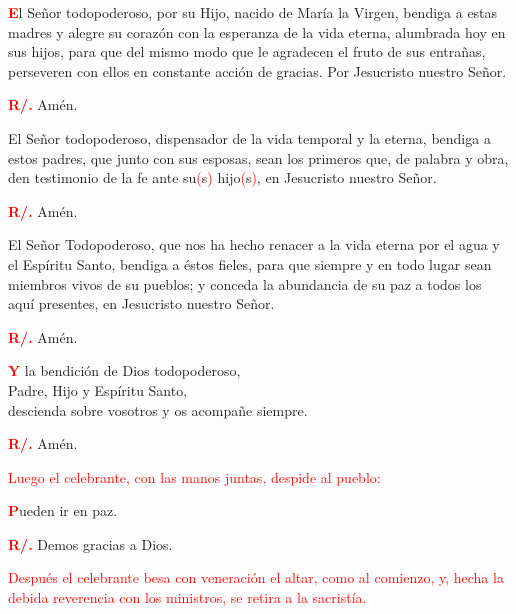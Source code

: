 \documentclass[12pt, letterpaper, spanish]{article}
\begin{document}
  \lettrine[lines=2]{\bfseries \textcolor{red}{E}}{}\Large l Se\~nor todopoderoso, por su Hijo, nacido de Mar\'ia la Virgen, bendiga a estas madres y alegre su coraz\'on con la esperanza de la vida eterna, alumbrada hoy en sus hijos, para que del mismo modo que le agradecen el fruto de sus entra\~nas, perseveren con ellos en constante acci\'on de gracias. Por Jesucristo nuestro Se\~nor.

  \noindent
  \Large {\bfseries \textcolor{red}{R/.}} \hspace{0.5cm} Am\'en.

  \noindent
  \Large El Se\~nor todopoderoso, dispensador de la vida temporal y la eterna, bendiga a estos padres, que junto con sus esposas, sean los primeros que, de palabra y obra, den testimonio de la fe ante su\textcolor{red}{(}s\textcolor{red}{)} hijo\textcolor{red}{(}s\textcolor{red}{)}, en Jesucristo nuestro Se\~nor.

  \noindent
  \Large {\bfseries \textcolor{red}{R/.}} \hspace{0.5cm} Am\'en.

  \noindent
  \Large El Se\~nor Todopoderoso, que nos ha hecho renacer a la vida eterna por el agua y el Esp\'iritu Santo, bendiga a \'estos fieles, para que siempre y en todo lugar sean miembros vivos de su pueblos; y conceda la abundancia de su paz a todos los aqu\'i presentes, en Jesucristo nuestro Se\~nor.

  \noindent
  \Large {\bfseries \textcolor{red}{R/.}} \hspace{0.5cm} Am\'en.

  \clearpage

  \lettrine[lines=2]{\bfseries \textcolor{red}{Y}}{} \Large la bendici\'on de Dios todopoderoso, \\
  Padre, Hijo \Huge{\textcolor{red}{}} \Large y Esp\'iritu Santo, \\
  descienda sobre vosotros y os acompa\~ne siempre.

  \noindent
  \Large {\bfseries \textcolor{red}{R/.}} \hspace{0.5cm} Am\'en.

  \large{\textcolor{red}{Luego el celebrante, con las manos juntas, despide al pueblo:}}
  
  \lettrine[lines=1]{\bfseries \textcolor{red}{P}}{}\Large ueden ir en paz.

  \noindent
  \Large {\bfseries \textcolor{red}{R/.}} \hspace{0.5cm} Demos gracias a Dios.

  \large{\textcolor{red}{Despu\'es el celebrante besa con veneraci\'on el altar, como al comienzo, y, hecha la debida reverencia con los ministros, se retira a la sacrist\'ia.}}
\end{document}
